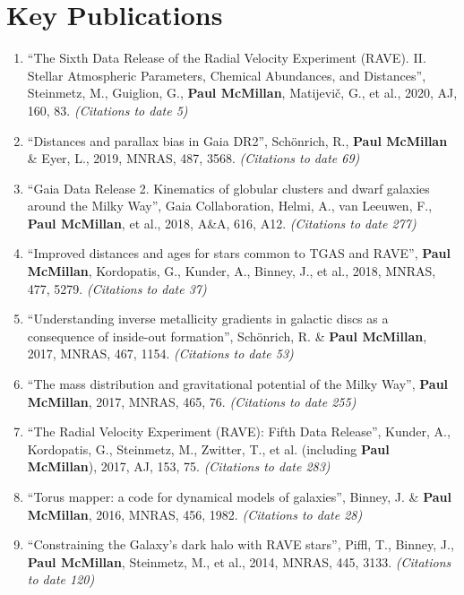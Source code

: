 \documentclass{resume}
\begin{document}
\section*{Key Publications}

\begin{enumerate}
\item ``The Sixth Data Release of the Radial Velocity Experiment (RAVE). II. Stellar Atmospheric Parameters, Chemical Abundances, and Distances'', Steinmetz, M., Guiglion, G., \textbf{Paul McMillan}, Matijevi\v{c}, G., et al., 2020, AJ, 160, 83. \textit{(Citations to date 5)}

\item ``Distances and parallax bias in Gaia DR2'', Sch\"onrich, R., \textbf{Paul McMillan} \& Eyer, L., 2019, MNRAS, 487, 3568. \textit{(Citations to date 69)}

\item ``Gaia Data Release 2. Kinematics of globular clusters and dwarf galaxies around the Milky Way'', Gaia Collaboration, Helmi, A., van Leeuwen, F., \textbf{Paul McMillan}, et al., 2018, A\&A, 616, A12. \textit{(Citations to date 277)}

\item ``Improved distances and ages for stars common to TGAS and RAVE'', \textbf{Paul McMillan}, Kordopatis, G., Kunder, A., Binney, J., et al., 2018, MNRAS, 477, 5279. \textit{(Citations to date 37)}

\item ``Understanding inverse metallicity gradients in galactic discs as a consequence of inside-out formation'', Sch\"onrich, R. \& \textbf{Paul McMillan}, 2017, MNRAS, 467, 1154. \textit{(Citations to date 53)}

\item ``The mass distribution and gravitational potential of the Milky Way'', \textbf{Paul McMillan}, 2017, MNRAS, 465, 76. \textit{(Citations to date 255)}

\item ``The Radial Velocity Experiment (RAVE): Fifth Data Release'', Kunder, A., Kordopatis, G., Steinmetz, M., Zwitter, T., et al. (including \textbf{Paul McMillan}), 2017, AJ, 153, 75. \textit{(Citations to date 283)}

\item ``Torus mapper: a code for dynamical models of galaxies'', Binney, J. \& \textbf{Paul McMillan}, 2016, MNRAS, 456, 1982. \textit{(Citations to date 28)}

\item ``Constraining the Galaxy's dark halo with RAVE stars'', Piffl, T., Binney, J., \textbf{Paul McMillan}, Steinmetz, M., et al., 2014, MNRAS, 445, 3133. \textit{(Citations to date 120)}


\end{enumerate}
\end{document}
